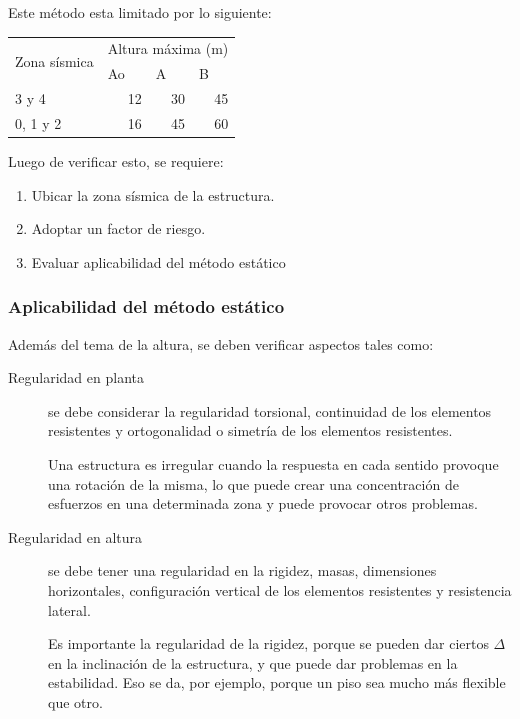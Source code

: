 \documentclass[../main.tex]{subfiles}
\begin{document}
Este método esta limitado por lo siguiente:

\begin{table}[htbp]
  \centering
    \begin{tabular}{|l|r|r|r|}
    \hline
    \multicolumn{1}{|c|}{\multirow{2}[4]{*}{Zona sísmica}} & \multicolumn{3}{c|}{Altura máxima (m)} \bigstrut\\
\cline{2-4}          & \multicolumn{1}{l|}{Ao} & \multicolumn{1}{l|}{A} & \multicolumn{1}{l|}{B} \bigstrut\\
    \hline
    3 y 4 & 12    & 30    & 45 \bigstrut\\
    \hline
    0, 1 y 2 & 16    & 45    & 60 \bigstrut\\
    \hline
    \end{tabular}%
\end{table}%

Luego de verificar esto, se requiere:

\begin{enumerate}
  \item Ubicar la zona sísmica de la estructura.
  \item Adoptar un factor de riesgo.
  \item Evaluar aplicabilidad del método estático
\end{enumerate}

\subsubsection{Aplicabilidad del método estático}

Además del tema de la altura, se deben verificar aspectos tales como:

\begin{description}
  \item[Regularidad en planta] se debe considerar la regularidad torsional,
    continuidad de los elementos resistentes y ortogonalidad o simetría de los
    elementos resistentes.

    Una estructura es irregular cuando la respuesta en cada sentido provoque una
    rotación de la misma, lo que puede crear una concentración de esfuerzos en una
    determinada zona y puede provocar otros problemas.

  \item[Regularidad en altura] se debe tener una regularidad en la rigidez,
    masas, dimensiones horizontales, configuración vertical de los elementos
    resistentes y resistencia lateral.

    Es importante la regularidad de la rigidez, porque se pueden dar ciertos $\Delta$
    en la inclinación de la estructura, y que puede dar problemas en la estabilidad.
    Eso se da, por ejemplo, porque un piso sea mucho más flexible que otro.
\end{description}
\end{document}
